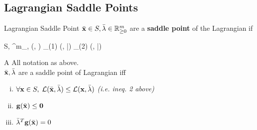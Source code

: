 
\subsection{Lagrangian Saddle Points}

\begin{defn}{Lagrangian Saddle Point}{}
$\bar{\mathbf{x}} \in S, \bar{\lambda} \in \mathbb{R}^m_{\geq 0}$ are a 
\textbf{saddle point} of the Lagrangian if 
\begin{frml}
	\forall \vx \in S, \lambda \in \reals^m_{}, \;\; (\bx, \lambda)
	\leq_{(1)} (\bx, \bar{\lambda}) \leq_{(2)} (\vx, \bar{\lambda}) \\
\end{frml}
\end{defn}

\begin{theo}{A}{}
	All notation as above.
	\medskip\\
	$\bar{\mathbf{x}}, \bar{\lambda}$ are a saddle point of
	Lagrangian iff 
	\begin{enumerate}[i)]
		\item $\forall \mathbf{x} \in S, \; \mathcal{L}(\bar{\mathbf{x}}, \bar{\lambda}) \leq \mathcal{L}(\mathbf{x}, \bar{\lambda})$
			\textit{(i.e. ineq. 2 above)}
		\item $\mathbf{g}(\bar{\mathbf{x}}) \leq \mathbf{0}$
		\item $\bar{\lambda}^T\mathbf{g}(\bar{\mathbf{x}}) = 0$
	\end{enumerate}
\end{theo}

